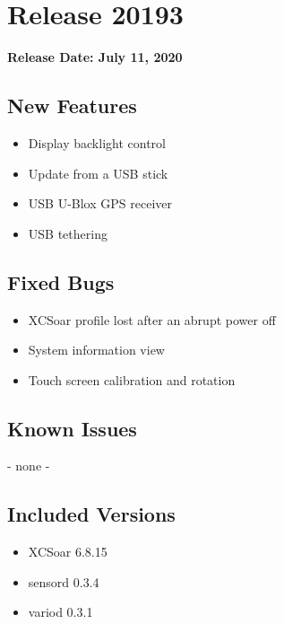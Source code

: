 \chapter*{Release 20193}

\begin{flushleft}
	\textbf{Release Date: July 11, 2020}
\end{flushleft}

\section*{New Features}

\begin{itemize}
	\item Display backlight control
	\item Update from a USB stick
	\item USB U-Blox GPS receiver
	\item USB tethering
\end{itemize}

\section*{Fixed Bugs}
\begin{itemize}
	\item XCSoar profile lost after an abrupt power off
	\item System information view
	\item Touch screen calibration and rotation
\end{itemize}

\section*{Known Issues}
	- none -

\section*{Included Versions}

\begin{itemize}
	\item XCSoar 6.8.15
	\item sensord 0.3.4
	\item variod 0.3.1
\end{itemize}
